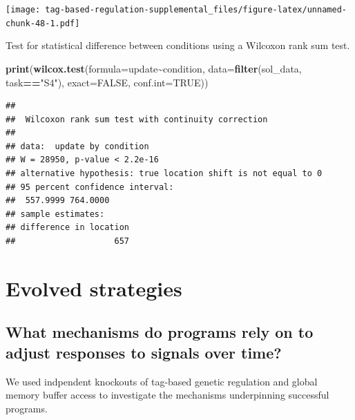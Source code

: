 \documentclass[
]{book}
\newenvironment{Shaded}{\begin{snugshade}}{\end{snugshade}}
\newcommand{\DataTypeTok}[1]{\textcolor[rgb]{0.13,0.29,0.53}{#1}}
\newcommand{\KeywordTok}[1]{\textcolor[rgb]{0.13,0.29,0.53}{\textbf{#1}}}
\newcommand{\NormalTok}[1]{#1}
\newcommand{\OperatorTok}[1]{\textcolor[rgb]{0.81,0.36,0.00}{\textbf{#1}}}
\newcommand{\OtherTok}[1]{\textcolor[rgb]{0.56,0.35,0.01}{#1}}
\newcommand{\StringTok}[1]{\textcolor[rgb]{0.31,0.60,0.02}{#1}}
\begin{document}
\texttt{[image: tag-based-regulation-supplemental\_files/figure-latex/unnamed-chunk-48-1.pdf]}

Test for statistical difference between conditions using a Wilcoxon rank sum test.

\begin{Shaded}
\begin{Highlighting}[]
\KeywordTok{print}\NormalTok{(}\KeywordTok{wilcox.test}\NormalTok{(}\DataTypeTok{formula=}\NormalTok{update}\OperatorTok{\textasciitilde{}}\NormalTok{condition, }\DataTypeTok{data=}\KeywordTok{filter}\NormalTok{(sol\_data, task}\OperatorTok{==}\StringTok{"S4"}\NormalTok{), }\DataTypeTok{exact=}\OtherTok{FALSE}\NormalTok{, }\DataTypeTok{conf.int=}\OtherTok{TRUE}\NormalTok{))}
\end{Highlighting}
\end{Shaded}

\begin{verbatim}
## 
##  Wilcoxon rank sum test with continuity correction
## 
## data:  update by condition
## W = 28950, p-value < 2.2e-16
## alternative hypothesis: true location shift is not equal to 0
## 95 percent confidence interval:
##  557.9999 764.0000
## sample estimates:
## difference in location 
##                    657
\end{verbatim}

\hypertarget{evolved-strategies}{%
\section{Evolved strategies}\label{evolved-strategies}}

\hypertarget{what-mechanisms-do-programs-rely-on-to-adjust-responses-to-signals-over-time}{%
\subsection{What mechanisms do programs rely on to adjust responses to signals over time?}\label{what-mechanisms-do-programs-rely-on-to-adjust-responses-to-signals-over-time}}

We used indpendent knockouts of tag-based genetic regulation and global memory buffer access to investigate the mechanisms underpinning successful programs.
\end{document}
